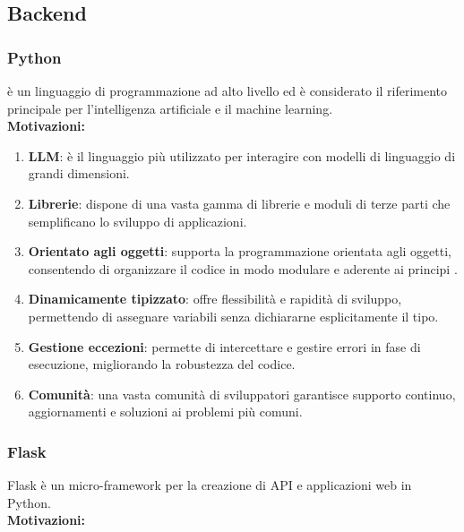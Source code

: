 
\subsection{Backend}
\label{subsec:Backend}

\subsubsection{Python}
\label{subsubsec:Python}
 è un linguaggio di programmazione ad alto livello ed è considerato il riferimento principale per l'intelligenza artificiale e il machine learning.\\  

\textbf{Motivazioni:}  

\begin{enumerate}
    \item \textbf{LLM}: è il linguaggio più utilizzato per interagire con modelli di linguaggio di grandi dimensioni.
    \item \textbf{Librerie}: dispone di una vasta gamma di librerie e moduli di terze parti che semplificano lo sviluppo di applicazioni.
    \item \textbf{Orientato agli oggetti}: supporta la programmazione orientata agli oggetti, consentendo di organizzare il codice in modo modulare e aderente ai principi .
    \item \textbf{Dinamicamente tipizzato}: offre flessibilità e rapidità di sviluppo, permettendo di assegnare variabili senza dichiararne esplicitamente il tipo.
    \item \textbf{Gestione eccezioni}: permette di intercettare e gestire errori in fase di esecuzione, migliorando la robustezza del codice.
    \item \textbf{Comunità}: una vasta comunità di sviluppatori garantisce supporto continuo, aggiornamenti e soluzioni ai problemi più comuni.
\end{enumerate}

\subsubsection{Flask}
\label{subsubsec:Flask}
Flask è un micro-framework per la creazione di API e applicazioni web in Python.\\

\textbf{Motivazioni:}

